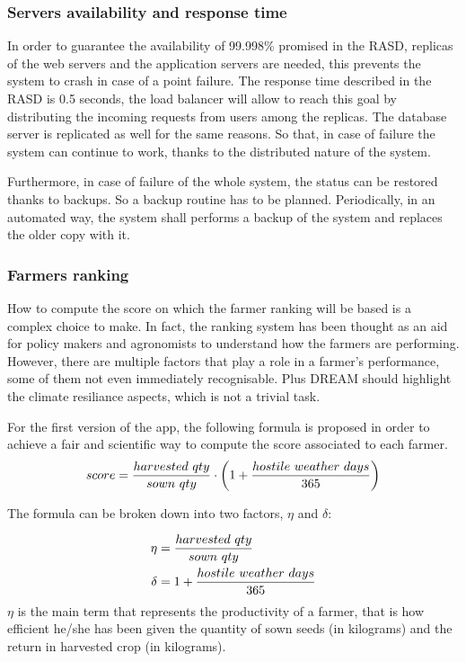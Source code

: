 \documentclass[table, 12pt]{article}
\begin{document}
\subsubsection{Servers availability and response time} 
In order to guarantee the availability of 99.998\% promised in the RASD, replicas of the web servers and the application servers are needed, this prevents the system to crash in case of a point failure.
The response time described in the RASD is 0.5 seconds, the load balancer will allow to reach this goal by distributing the incoming requests from users among the replicas.
The database server is replicated as well for the same reasons.
So that, in case of failure the system can continue to work, thanks to the distributed nature of the system. 

Furthermore, in case of failure of the whole system, the status can be restored thanks to backups. 
So a backup routine has to be planned.
Periodically, in an automated way, the system shall performs a backup of the system and replaces the older copy with it.
\subsubsection{Farmers ranking} 
How to compute the score on which the farmer ranking will be based is a complex choice to make. In fact, the ranking system has been thought as an aid for policy makers and agronomists to understand how the farmers are performing. However, there are multiple factors that play a role in a farmer's performance, some of them not even immediately recognisable. Plus DREAM should highlight the climate resiliance aspects, which is not a trivial task.

For the first version of the app, the following formula is proposed in order to achieve a fair and scientific way to compute the score associated to each farmer.
\begin{equation}
    score = {harvested\ qty\over sown\ qty}\cdot \left( 1 + {hostile\ weather\ days\over 365}\right)
\end{equation}

The formula can be broken down into two factors, $\eta$ and $\delta$:

\begin{align}  
    \eta &= {harvested\ qty\over sown\ qty}\\
    \delta &= 1 + {hostile\ weather\ days\over 365}
\end{align}
$\eta$ is the main term that represents the productivity of a farmer, that is how efficient he/she has been given the quantity of sown seeds (in kilograms) and the return in harvested crop (in kilograms). 
\end{document}
